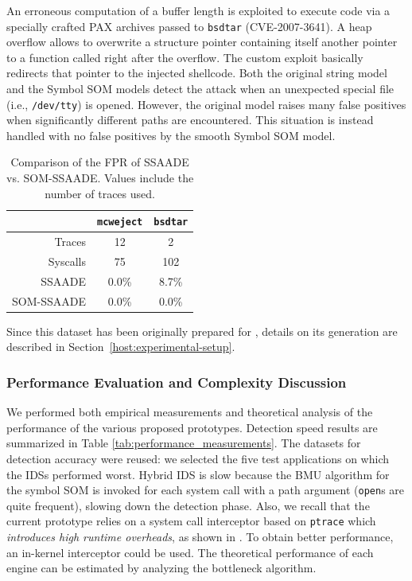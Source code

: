 An erroneous computation of a buffer length is exploited to execute code via a specially crafted PAX archives passed to \texttt{bsdtar} (CVE-2007-3641). A heap overflow allows to overwrite a structure pointer containing itself another pointer to a function called right after the overflow. The custom exploit \citep{zanero_self} basically redirects that pointer to the injected shellcode. Both the original string model and the Symbol \ac{SOM} models detect the attack when an unexpected special file (i.e., \texttt{/dev/tty}) is opened. However, the original model raises many false positives when significantly different paths are encountered. This situation is instead handled with no false positives by the smooth Symbol \ac{SOM} model.

\begin{table}[p]
  \centering
  \begin{tabular*}{\columnwidth}{@{\extracolsep{\fill}}rcc}

    \toprule

    & \texttt{mcweject} & \texttt{bsdtar} \\

    \midrule

    Traces & 12 & 2 \\
    Syscalls & 75 & 102\\
    \ac{SSAADE} & 0.0\% & 8.7\%\\
    SOM-\ac{SSAADE} & 0.0\% & 0.0\%\\
    \bottomrule
  \end{tabular*}
  
  \caption{Comparison of the \ac{FPR} of \ac{SSAADE} vs. SOM-\ac{SSAADE}. Values include the number of traces used.}
  \label{tab:testing2-som}
\end{table}

Since this dataset has been originally prepared for \citep{zanero_self,10.1109/TDSC.2008.69}, details on its generation are described in Section~\ref{host:experimental-setup}.

\subsubsection{Performance Evaluation and Complexity Discussion}
\label{host:improving:test_performance}
We performed both empirical measurements and theoretical analysis of the performance of the various proposed prototypes. Detection speed results are summarized in Table \ref{tab:performance_measurements}. The datasets for detection accuracy were reused: we selected the five test applications on which the \acp{IDS} performed worst. Hybrid IDS is slow because the \ac{BMU} algorithm for the symbol \ac{SOM} is invoked for each system call with a path argument (\texttt{open}s are quite frequent), slowing down the detection phase. Also, we recall that the current prototype relies on a system call interceptor based on \texttt{ptrace} which \emph{introduces high runtime overheads}, as shown in \citep{venkat_dataflow}. To obtain better performance, an in-kernel interceptor could be used. The theoretical performance of each engine can be estimated by analyzing the bottleneck algorithm.


